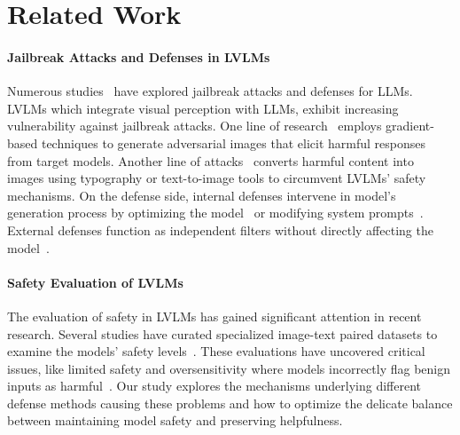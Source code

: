 \section{Related Work}
\paragraph{Jailbreak Attacks and Defenses in LVLMs}
Numerous studies~\cite{wei2024jailbroken,chao2023jailbreaking,zou2023universal,liu2023autodan,robey2023smoothllm,xie2023defending} have explored jailbreak attacks and defenses for LLMs. LVLMs which integrate visual perception with LLMs, exhibit increasing vulnerability against jailbreak attacks. One line of research~\cite{dong2023robust, bailey2023image,luo2023image,shayegani2023jailbreak} employs gradient-based techniques to generate adversarial images that elicit harmful responses from target models. Another line of attacks~\cite{gong2023figstep,liu2023query} converts harmful content into images using typography or text-to-image tools to circumvent LVLMs' safety mechanisms. On the defense side, internal defenses intervene in model’s generation process by optimizing the model~\cite{zong2024safety,zhang2024spa} or modifying system prompts~\cite{zhang2024jailguarduniversaldetectionframework,gou2024eyes}. External defenses function as independent filters without directly affecting the model~\cite{pi2024mllm,zhao2024first,helff2024llavaguard}.

\paragraph{Safety Evaluation of LVLMs}
The evaluation of safety in LVLMs has gained significant attention in recent research.
Several studies have curated specialized image-text paired datasets to examine the models' safety levels~\cite{liu2023query,wang2023tovilag,li2024red}. These evaluations have uncovered critical issues, like limited safety and oversensitivity where models incorrectly flag benign inputs as harmful~\cite{li2024mossbench}. Our study explores the mechanisms underlying different defense methods causing these problems and how to optimize the delicate balance between maintaining model safety and preserving helpfulness.